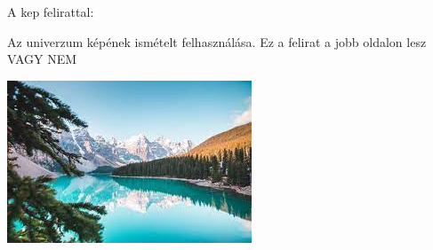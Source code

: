 \documentclass{article}
\begin{document}
A kep felirattal:


\begin { SCfigure }
 \caption { Az univerzum képének ismételt felhasználása.
Ez a felirat a jobb oldalon lesz VAGY NEM} 
\includegraphics  { kep.jpg } 
\end { SCfigure }
\end{document}
